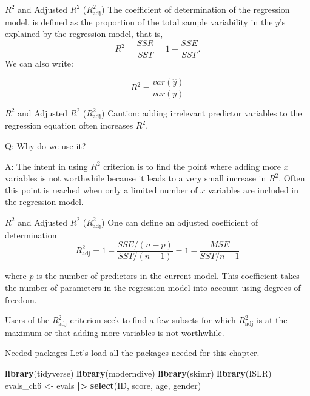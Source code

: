 \documentclass[
  ignorenonframetext,
]{beamer}
\newenvironment{Shaded}{\begin{snugshade}}{\end{snugshade}}
\newcommand{\FunctionTok}[1]{\textcolor[rgb]{0.13,0.29,0.53}{\textbf{#1}}}
\newcommand{\NormalTok}[1]{#1}
\newcommand{\OtherTok}[1]{\textcolor[rgb]{0.56,0.35,0.01}{#1}}
\newcommand{\SpecialCharTok}[1]{\textcolor[rgb]{0.81,0.36,0.00}{\textbf{#1}}}
\begin{document}
\begin{frame}{\(R^2\) and Adjusted \(R^2\) (\(R^2_{\text{adj}}\))}
\label{r2-and-adjusted-r2-r2_textadj}
The coefficient of determination of the regression model, is defined as
the proportion of the total sample variability in the \(y\)'s explained
by the regression model, that is,
\[R^2=\frac{SSR}{SST}=1-\frac{SSE}{SST}.\] We can also write:

\[R^2=\frac{var(\hat{y})}{var(y)}\]
\end{frame}

\begin{frame}{\(R^2\) and Adjusted \(R^2\) (\(R^2_{\text{adj}}\))}
\label{r2-and-adjusted-r2-r2_textadj-1}
Caution: adding irrelevant predictor variables to the regression
equation often increases \(R^2\).

Q: Why do we use it?

A: The intent in using \(R^2\) criterion is to find the point where
adding more \(x\) variables is not worthwhile because it leads to a very
small increase in \(R^2\). Often this point is reached when only a
limited number of \(x\) variables are included in the regression model.
\end{frame}

\begin{frame}{\(R^2\) and Adjusted \(R^2\) (\(R^2_{\text{adj}}\))}
\label{r2-and-adjusted-r2-r2_textadj-2}
One can define an adjusted coefficient of determination
\[R^2_{\text{adj}}=1-\frac{SSE/(n-p)}{SST/ (n-1)}=1-\frac{MSE}{SST/n-1}\]

where \(p\) is the number of predictors in the current model. This
coefficient takes the number of parameters in the regression model into
account using degrees of freedom.

Users of the \(R^2_{\text{adj}}\) criterion seek to find a few subsets
for which \(R^2_{\text{adj}}\) is at the maximum or that adding more
variables is not worthwhile.
\end{frame}

\begin{frame}[fragile]{Needed packages}
\label{needed-packages}
Let's load all the packages needed for this chapter.

\normalsize

\begin{Shaded}
\begin{Highlighting}[]
\FunctionTok{library}\NormalTok{(tidyverse) }
\FunctionTok{library}\NormalTok{(moderndive)}
\FunctionTok{library}\NormalTok{(skimr)}
\FunctionTok{library}\NormalTok{(ISLR)}
\NormalTok{evals\_ch6 }\OtherTok{\textless{}{-}}\NormalTok{ evals }\SpecialCharTok{|\textgreater{}}
  \FunctionTok{select}\NormalTok{(ID, score, age, gender)}
\end{Highlighting}
\end{Shaded}

\normalsize
\end{frame}
\end{document}
